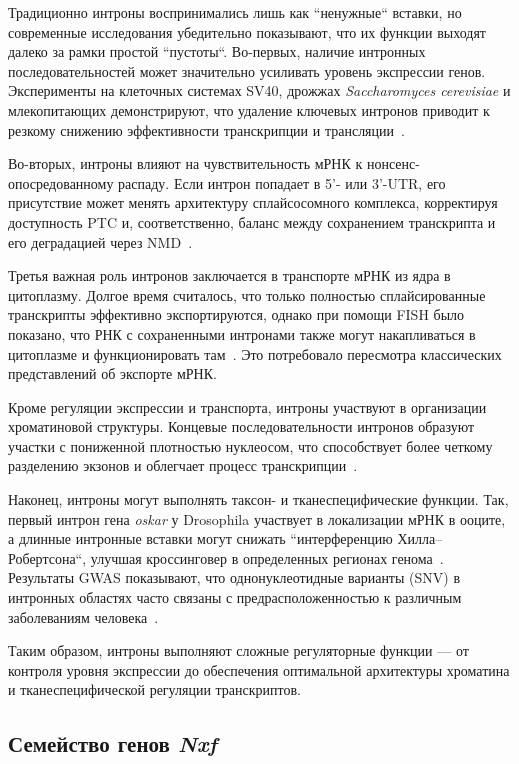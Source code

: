 Традиционно интроны воспринимались лишь как ``ненужные`` вставки, но современные исследования убедительно показывают, что их функции выходят далеко за рамки простой ``пустоты``.
Во-первых, наличие интронных последовательностей может значительно усиливать уровень экспрессии генов.
Эксперименты на клеточных системах SV40, дрожжах \textit{Saccharomyces cerevisiae} и млекопитающих демонстрируют, что удаление ключевых интронов приводит к резкому снижению эффективности транскрипции и трансляции~\cite{Gruss1979,Juneau2006}.

Во-вторых, интроны влияют на чувствительность мРНК к нонсенс-опосредованному распаду.
Если интрон попадает в 5'- или 3'-UTR, его присутствие может менять архитектуру сплайсосомного комплекса, корректируя доступность PTC и, соответственно, баланс между сохранением транскрипта и его деградацией через NMD~\cite{Jo2015,Kalyna2012}.

Третья важная роль интронов заключается в транспорте мРНК из ядра в цитоплазму.
Долгое время считалось, что только полностью сплайсированные транскрипты эффективно экспортируются, однако при помощи FISH было показано, что РНК с сохраненными интронами также могут накапливаться в цитоплазме и функционировать там~\cite{Valencia2008,Jo2015}.
Это потребовало пересмотра классических представлений об экспорте мРНК.

Кроме регуляции экспрессии и транспорта, интроны участвуют в организации хроматиновой структуры.
Концевые последовательности интронов образуют участки с пониженной плотностью нуклеосом, что способствует более четкому разделению экзонов и облегчает процесс транскрипции~\cite{Schwartz2009}.

Наконец, интроны могут выполнять таксон- и тканеспецифические функции.
Так, первый интрон гена \textit{oskar} у Drosophila участвует в локализации мРНК в ооците, а длинные интронные вставки могут снижать ``интерференцию Хилла–Робертсона``, улучшая кроссинговер в определенных регионах генома~\cite{Comeron2008}.
Результаты GWAS показывают, что однонуклеотидные варианты (SNV) в интронных областях часто связаны с предрасположенностью к различным заболеваниям человека~\cite{Welter2014}.

Таким образом, интроны выполняют сложные регуляторные функции — от контроля уровня экспрессии до обеспечения оптимальной архитектуры хроматина и тканеспецифической регуляции транскриптов.


\subsection{Семейство генов \textit{Nxf}}

